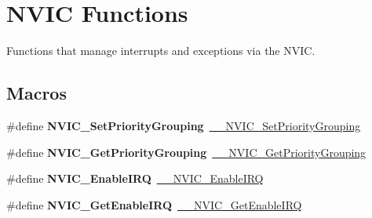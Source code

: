 \hypertarget{group___c_m_s_i_s___core___n_v_i_c_functions}{}\section{N\+V\+IC Functions}
\label{group___c_m_s_i_s___core___n_v_i_c_functions}


Functions that manage interrupts and exceptions via the N\+V\+IC.  


\subsection*{Macros}
\begin{DoxyCompactItemize}
\item 
\mbox{\label{group___c_m_s_i_s___core___n_v_i_c_functions_ga0e798d5aec68cdd8263db86a76df788f}} 
\#define {\bfseries N\+V\+I\+C\+\_\+\+Set\+Priority\+Grouping}~\hyperlink{group___c_m_s_i_s___core___n_v_i_c_functions_gafc94dcbaee03e4746ade1f5bb9aaa56d}{\+\_\+\+\_\+\+N\+V\+I\+C\+\_\+\+Set\+Priority\+Grouping}
\item 
\mbox{\label{group___c_m_s_i_s___core___n_v_i_c_functions_ga4eeb9214f2264fc23c34ad5de2d3fa11}} 
\#define {\bfseries N\+V\+I\+C\+\_\+\+Get\+Priority\+Grouping}~\hyperlink{group___c_m_s_i_s___core___n_v_i_c_functions_ga9b894af672df4373eb637f8288845c05}{\+\_\+\+\_\+\+N\+V\+I\+C\+\_\+\+Get\+Priority\+Grouping}
\item 
\mbox{\label{group___c_m_s_i_s___core___n_v_i_c_functions_ga57b3064413dbc7459d9646020fdd8bef}} 
\#define {\bfseries N\+V\+I\+C\+\_\+\+Enable\+I\+RQ}~\hyperlink{group___c_m_s_i_s___core___n_v_i_c_functions_ga71227e1376cde11eda03fcb62f1b33ea}{\+\_\+\+\_\+\+N\+V\+I\+C\+\_\+\+Enable\+I\+RQ}
\item 
\mbox{\label{group___c_m_s_i_s___core___n_v_i_c_functions_ga857de13232ec65dd15087eaa15bc4a69}} 
\#define {\bfseries N\+V\+I\+C\+\_\+\+Get\+Enable\+I\+RQ}~\hyperlink{group___c_m_s_i_s___core___n_v_i_c_functions_gaaeb5e7cc0eaad4e2817272e7bf742083}{\+\_\+\+\_\+\+N\+V\+I\+C\+\_\+\+Get\+Enable\+I\+RQ}
\item 
\mbox{\label{group___c_m_s_i_s___core___n_v_i_c_functions_ga73b4e251f59cab4e9a5e234aac02ae57}} 

\end{DoxyCompactItemize}
